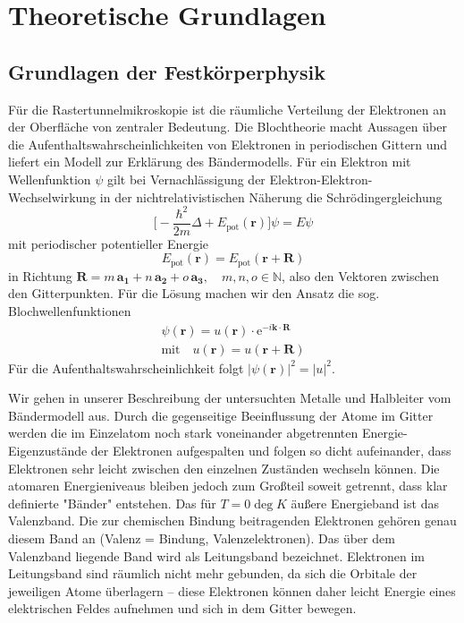 \section{Theoretische Grundlagen}

\subsection{Grundlagen der Festkörperphysik}
Für die Rastertunnelmikroskopie ist die räumliche Verteilung der Elektronen an 
der Oberfläche von zentraler Bedeutung. Die Blochtheorie macht Aussagen über 
die Aufenthaltswahrscheinlichkeiten von Elektronen in periodischen 
Gittern und liefert ein Modell zur Erklärung des Bändermodells. 
Für ein Elektron mit Wellenfunktion $\psi$ gilt bei Vernachlässigung der 
Elektron-Elektron-Wechselwirkung in der nichtrelativistischen Näherung die 
Schrödingergleichung 
\begin{equation}
    \Big[ - \frac{\hbar^2}{2m} \Delta + E_{\mathrm{pot}}(\mathbf{r}) \Big] \psi = E \psi
\end{equation}
mit periodischer potentieller Energie 
\begin{equation}
    E_{\mathrm{pot}}(\mathbf{r}) = E_{\mathrm{pot}}(\mathbf{r + R})
\end{equation}
in Richtung $\mathbf{R} = m \,\mathbf{a_1} + n \,\mathbf{a_2} + o \,\mathbf{a_3}, 
\quad m, n, o \in \mathbb{N}$, also den Vektoren zwischen den Gitterpunkten. 
Für die Lösung machen wir den Ansatz die sog. Blochwellenfunktionen
\begin{eqnarray}
    \psi(\mathbf{r}) = u(\mathbf{r}) \cdot \mathrm{e}^{-i \mathbf{k \cdot R}} \\
    \mathrm{mit} \quad u(\mathbf{r}) = u(\mathbf{r + R}) \nonumber
\end{eqnarray}
Für die Aufenthaltswahrscheinlichkeit folgt $|\psi(\mathbf{r})|^2 = |u|^2$. 

Wir gehen in unserer Beschreibung der untersuchten Metalle und Halbleiter 
vom Bändermodell aus. Durch die gegenseitige Beeinflussung der Atome im Gitter
werden die im Einzelatom noch stark voneinander abgetrennten Energie-Eigenzustände
der Elektronen aufgespalten und folgen so dicht aufeinander, dass Elektronen 
sehr leicht zwischen den einzelnen Zuständen wechseln können. Die atomaren
Energieniveaus bleiben jedoch zum Großteil soweit getrennt, dass klar definierte
"Bänder" entstehen. Das für $T = 0\deg K$ äußere Energieband ist das Valenzband.
Die zur chemischen Bindung beitragenden Elektronen gehören genau diesem Band an 
(Valenz = Bindung, Valenzelektronen). Das über dem Valenzband liegende Band wird 
als Leitungsband bezeichnet. Elektronen im Leitungsband sind räumlich nicht mehr 
gebunden, da sich die Orbitale der jeweiligen Atome überlagern – diese Elektronen 
können daher leicht Energie eines elektrischen Feldes aufnehmen und sich in dem 
Gitter bewegen. \\


